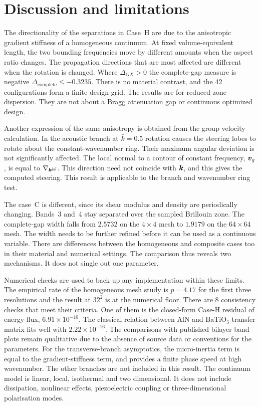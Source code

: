 \section{Discussion and limitations}
\label{sec:discussion}

The directionality of the separations in Case~H are due to the anisotropic gradient stiffness of a homogeneous continuum. At fixed volume-equivalent length, the two bounding frequencies move by different amounts when the aspect ratio changes. The propagation directions that are most affected are different when the rotation is changed. Where $\Delta_{GX}>0$ the complete-gap measure is negative $\Delta_{\mathrm{complete}}\le -0.3235$. There is no material contrast, and the 42 configurations form a finite design grid. The results are for reduced-zone dispersion. They are not about a Bragg attenuation gap or continuous optimized design.

Another expression of the same anisotropy is obtained from the group velocity calculation. In the acoustic branch at $\bar{k}=0.5$ rotation causes the steering lobes to rotate about the constant-wavenumber ring. Their maximum angular deviation is not significantly affected. The local normal to a contour of constant frequency, $\bm{v}_g$, is equal to $\nabla_{\bm{k}}\omega$. This direction need not coincide with $\bm{k}$, and this gives the computed steering. This result is applicable to the branch and wavenumber ring test.

The case~C is different, since its shear modulus and density are periodically changing. Bands~3 and~4 stay separated over the sampled Brillouin zone. The complete-gap width falls from $2.5732$ on the $4\times4$ mesh to $1.9179$ on the $64\times64$ mesh. The width needs to be further refined before it can be used as a continuous variable. There are differences between the homogeneous and composite cases too in their material and numerical settings. The comparison thus reveals two mechanisms. It does not single out one parameter.

Numerical checks are used to back up any implementation within these limits. The empirical rate of the homogeneous mesh study is $p=4.17$ for the first three resolutions and the result at $32^2$ is at the numerical floor. There are 8 consistency checks that meet their criteria. One of them is the closed-form Case-H residual of energy-flux, $6.91\times10^{-10}$. The classical relation between AlN and BaTiO$_3$ transfer matrix fits well with $2.22\times10^{-16}$. The comparisons with published bilayer band plots remain qualitative due to the absence of source data or conventions for the parameters. For the transverse-branch asymptotics, the micro-inertia term is equal to the gradient-stiffness term, and provides a finite phase speed at high wavenumber. The other branches are not included in this result. The continuum model is linear, local, isothermal and two dimensional. It does not include dissipation, nonlinear effects, piezoelectric coupling or three-dimensional polarisation modes.